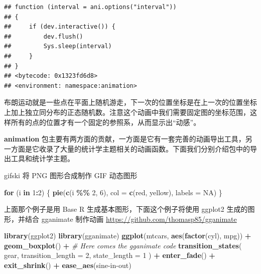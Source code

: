\documentclass[
  b5paper,
  UTF8,twoside]{book}
\newenvironment{Shaded}{\begin{snugshade}}{\end{snugshade}}
\newcommand{\AttributeTok}[1]{\textcolor[rgb]{0.13,0.29,0.53}{#1}}
\newcommand{\CommentTok}[1]{\textcolor[rgb]{0.56,0.35,0.01}{\textit{#1}}}
\newcommand{\ConstantTok}[1]{\textcolor[rgb]{0.56,0.35,0.01}{#1}}
\newcommand{\ControlFlowTok}[1]{\textcolor[rgb]{0.13,0.29,0.53}{\textbf{#1}}}
\newcommand{\DecValTok}[1]{\textcolor[rgb]{0.00,0.00,0.81}{#1}}
\newcommand{\FunctionTok}[1]{\textcolor[rgb]{0.13,0.29,0.53}{\textbf{#1}}}
\newcommand{\NormalTok}[1]{#1}
\newcommand{\SpecialCharTok}[1]{\textcolor[rgb]{0.81,0.36,0.00}{\textbf{#1}}}
\newcommand{\StringTok}[1]{\textcolor[rgb]{0.31,0.60,0.02}{#1}}
\begin{document}
\begin{verbatim}
## function (interval = ani.options("interval")) 
## {
##     if (dev.interactive()) {
##         dev.flush()
##         Sys.sleep(interval)
##     }
## }
## <bytecode: 0x1323fd6d8>
## <environment: namespace:animation>
\end{verbatim}

布朗运动就是一些点在平面上随机游走，下一次的位置坐标是在上一次的位置坐标上加上独立同分布的正态随机数。注意这个动画中我们需要固定图的坐标范围，这样所有的点的位置才有一个固定的参照系，从而显示出``动感''。

\textbf{animation} 包主要有两方面的贡献，一方面是它有一套完善的动画导出工具，另一方面是它收录了大量的统计学主题相关的动画函数。下面我们分别介绍包中的导出工具和统计学主题。

gifski 将 PNG 图形合成制作 GIF 动态图形

\begin{Shaded}
\begin{Highlighting}[]
\ControlFlowTok{for}\NormalTok{ (i }\ControlFlowTok{in} \DecValTok{1}\SpecialCharTok{:}\DecValTok{2}\NormalTok{) \{}
  \FunctionTok{pie}\NormalTok{(}\FunctionTok{c}\NormalTok{(i }\SpecialCharTok{\%\%} \DecValTok{2}\NormalTok{, }\DecValTok{6}\NormalTok{), }\AttributeTok{col =} \FunctionTok{c}\NormalTok{(}\StringTok{\textquotesingle{}red\textquotesingle{}}\NormalTok{, }\StringTok{\textquotesingle{}yellow\textquotesingle{}}\NormalTok{), }\AttributeTok{labels =} \ConstantTok{NA}\NormalTok{)}
\NormalTok{\}}
\end{Highlighting}
\end{Shaded}

\begin{center}\end{center}

上面那个例子是用 Base R 生成基本图形，下面这个例子将使用 ggplot2 生成的图形，并结合 gganimate 制作动画 \url{https://github.com/thomasp85/gganimate}

\begin{Shaded}
\begin{Highlighting}[]
\FunctionTok{library}\NormalTok{(ggplot2)}
\FunctionTok{library}\NormalTok{(gganimate)}
\FunctionTok{ggplot}\NormalTok{(mtcars, }\FunctionTok{aes}\NormalTok{(}\FunctionTok{factor}\NormalTok{(cyl), mpg)) }\SpecialCharTok{+} 
  \FunctionTok{geom\_boxplot}\NormalTok{() }\SpecialCharTok{+} 
  \CommentTok{\# Here comes the gganimate code}
  \FunctionTok{transition\_states}\NormalTok{(}
\NormalTok{    gear,}
    \AttributeTok{transition\_length =} \DecValTok{2}\NormalTok{,}
    \AttributeTok{state\_length =} \DecValTok{1}
\NormalTok{  ) }\SpecialCharTok{+}
  \FunctionTok{enter\_fade}\NormalTok{() }\SpecialCharTok{+} 
  \FunctionTok{exit\_shrink}\NormalTok{() }\SpecialCharTok{+}
  \FunctionTok{ease\_aes}\NormalTok{(}\StringTok{\textquotesingle{}sine{-}in{-}out\textquotesingle{}}\NormalTok{)}
\end{Highlighting}
\end{Shaded}
\end{document}
